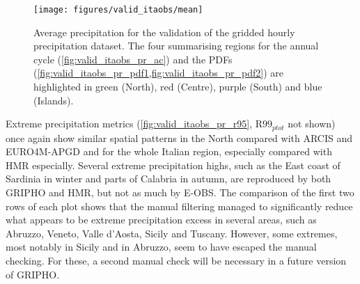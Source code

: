 \begin{figure}
    \centering
        \texttt{[image: figures/valid\_itaobs/mean]}
    \decoRule
    \caption[Validation of gridded hourly dataset: mean precipitation]{
        Average precipitation for the validation of the gridded hourly precipitation dataset. The four summarising regions for the annual cycle (\cref{fig:valid_itaobs_pr_ac}) and the PDFs (\cref{fig:valid_itaobs_pr_pdf1,fig:valid_itaobs_pr_pdf2}) are highlighted in green (North), red (Centre), purple (South) and blue (Islands).
} \label{fig:valid_itaobs_pr_mean}
\end{figure}

Extreme precipitation metrics (\cref{fig:valid_itaobs_pr_r95}, $\textrm{R99}_{ptot}$ not shown) once again show similar spatial patterns in the North compared with ARCIS and EURO4M-APGD and for the whole Italian region, especially compared with HMR especially.
Several extreme precipitation highs, such as the East coast of Sardinia in winter and parts of Calabria in autumn, are reproduced by both GRIPHO and HMR, but not as much by E-OBS.
The comparison of the first two rows of each plot shows that the manual filtering managed to significantly reduce what appears to be extreme precipitation excess in several areas, such as Abruzzo, Veneto, Valle d'Aosta, Sicily and Tuscany.
However, some extremes, most notably in Sicily and in Abruzzo, seem to have escaped the manual checking. For these, a second manual check will be necessary in a future version of GRIPHO.

